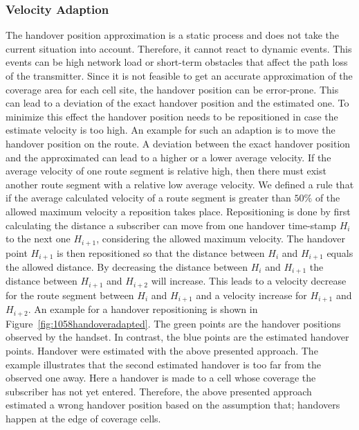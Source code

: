 \documentclass[master,english]{hgbthesis}
\begin{document}
\subsubsection{Velocity Adaption}
\label{sec:adaption}
The handover position approximation is a static process and does not take the current situation into account. Therefore, it cannot react to dynamic events. This events can be high network load or short-term obstacles that affect the path loss of the transmitter. Since it is not feasible to get an accurate approximation of the coverage area for each cell site, the handover position can be error-prone. This can lead to a deviation of the exact handover position and the estimated one. To minimize this effect the handover position needs to be repositioned in case the estimate velocity is too high. An example for such an adaption is to move the handover position on the route. 
A deviation between the exact handover position and the approximated can lead to a higher or a lower average velocity. If the average velocity of one route segment is relative high, then there must exist another route segment with a relative low average velocity. We defined a rule that if the average calculated velocity of a route segment is greater than $50\%$ of the allowed maximum velocity a reposition takes place.  
Repositioning is done by first calculating the distance a subscriber can move from one handover time-stamp $H_i$ to the next one $H_{i+1}$, considering the allowed maximum velocity. The handover point $H_{i+1 }$ is then repositioned so that the distance between $H_i$ and $H_{i+1}$ equals the allowed distance. By decreasing the distance between $H_i$ and $H_{i+1}$ the distance between $H_{i+1}$ and $H_{i+2}$ will increase. This leads to a velocity decrease for the route segment between $H_i$ and $H_{i+1}$ and a velocity increase for $H_{i+1}$  and $H_{i+2}$.
An example for a handover repositioning is shown in Figure~\ref{fig:1058handoveradapted}. The green points are the handover positions observed by the handset. In contrast, the blue points are the estimated handover points. Handover were estimated with the above presented approach. The example illustrates that the second estimated handover is too far from the observed one away. Here a handover is made to a cell whose coverage the subscriber has not yet entered. Therefore, the above presented approach estimated a wrong handover position based on the assumption that; handovers happen at the edge of coverage cells. 
\end{document}
